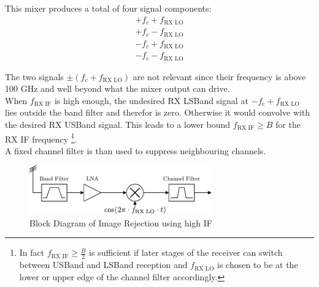 This mixer produces a total of four signal components:
\begin{align}
  + f_{c} + f_{\text{RX LO}} \\
  + f_{c} - f_{\text{RX LO}} \\
  - f_{c} + f_{\text{RX LO}} \\
  - f_{c} - f_{\text{RX LO}}
\end{align}

The two signals $\pm (f_{c} + f_{\text{RX LO}})$ are not relevant since their
frequency is above 100 GHz and well beyond what the mixer output can drive. \\

When $f_{\text{RX IF}}$ is high enough, the undesired \gls{RX} \gls{LSBand}
signal at $-f_{\text{c}} + f_{\text{RX LO}}$ lies outside the band filter
and therefor is zero. Otherwise it would convolve with the desired
\gls{RX} \gls{USBand} signal. This leads to a lower bound
$f_{\text{RX IF}} \geq B$ for the \gls{RX} \gls{IF} frequency
\footnote{%
  In fact $f_{\text{RX IF}} \geq \frac{B}{2}$
  is sufficient if later stages of the receiver can switch
  between \gls{USBand} and \gls{LSBand} reception and
  $f_{\text{RX LO}}$ is chosen to be at the lower or upper edge of the
  channel filter accordingly.}. \\

A fixed channel filter is than used to suppress neighbouring channels. \\

\begin{figure}[p]
  \centering
  \includegraphics[width=0.7\textwidth]{figures/rx_rf_0_bd}
  \caption{Block Diagram of Image Rejection using high \gls{IF}}
  \label{fig:rx_rf_0_bd}
\end{figure}

